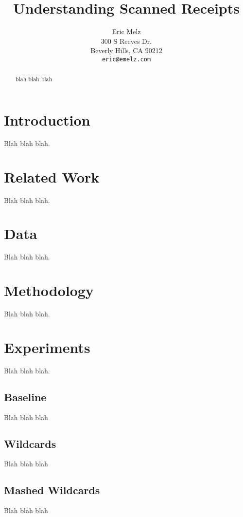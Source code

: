 \documentclass[11pt,a4paper]{article}
\title{Understanding Scanned Receipts}
\author{Eric Melz \\
  300 S Reeves Dr. \\
  Beverly Hills, CA 90212 \\
  \texttt{eric@emelz.com}
}
\date{}
\begin{document}
\maketitle
\begin{abstract}
blah blah blah
\end{abstract}

\section{Introduction}

Blah blah blah.

\section{Related Work}

Blah blah blah.
\cite{Gusfield:97} 

\section{Data}

Blah blah blah.

\section{Methodology}

Blah blah blah.

\section{Experiments}

Blah blah blah.

\subsection{Baseline}

Blah blah blah

\subsection{Wildcards}

Blah blah blah

\subsection{Mashed Wildcards}

Blah blah blah
\end{document}
